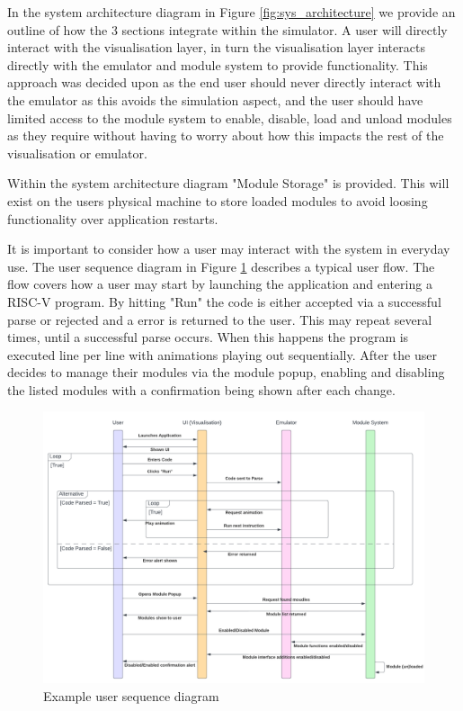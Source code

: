 In the system architecture diagram in Figure \ref{fig:sys_architecture} we provide an outline of how the 3 sections integrate within the simulator. A user will directly interact with the visualisation layer, in turn the visualisation layer interacts directly with the emulator and module system to provide functionality. This approach was decided upon as the end user should never directly interact with the emulator as this avoids the simulation aspect, and the user should have limited access to the module system to enable, disable, load and unload modules as they require without having to worry about how this impacts the rest of the visualisation or emulator.

Within the system architecture diagram "Module Storage" is provided. This will exist on the users physical machine to store loaded modules to avoid loosing functionality over application restarts.

It is important to consider how a user may interact with the system in everyday use. The user sequence diagram in Figure \ref{fig:user_sequence} describes a typical user flow. The flow covers how a user may start by launching the application and entering a RISC-V program. By hitting "Run" the code is either accepted via a successful parse or rejected and a error is returned to the user. This may repeat several times, until a successful parse occurs. When this happens the program is executed line per line with animations playing out sequentially. After the user decides to manage their modules via the module popup, enabling and disabling the listed modules with a confirmation being shown after each change.

\begin{figure}[h]
    \centering
    \includegraphics[width=0.95\linewidth]{dissertation/DATA/sequence diagram.png}
    \caption{Example user sequence diagram}
    \label{fig:user_sequence}
\end{figure}

